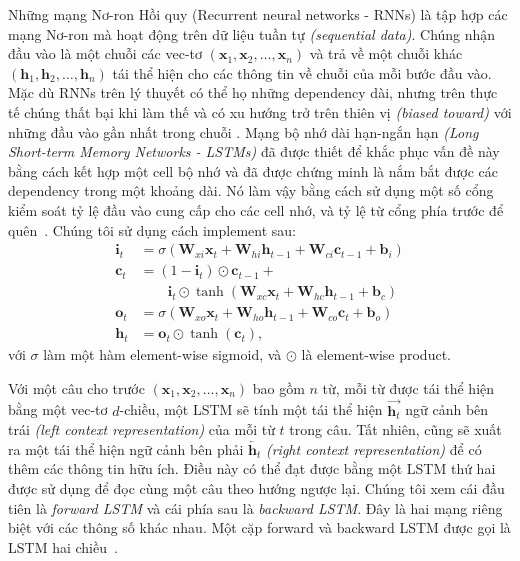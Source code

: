 \documentclass[11pt,letterpaper]{article}
\begin{document}
Những mạng Nơ-ron Hồi quy (Recurrent neural networks - RNNs) là tập hợp các mạng Nơ-ron mà hoạt động trên dữ liệu tuần tự \textit{(sequential data)}.
Chúng nhận đầu vào là một chuỗi các vec-tơ $(\mathbf{x}_1, \mathbf{x}_2, \ldots, \mathbf{x}_n)$ và trả về một chuỗi khác $(\mathbf{h}_1, \mathbf{h}_2, \ldots, \mathbf{h}_n)$ tái thể hiện cho các thông tin về chuỗi của mỗi bước đầu vào.
Mặc dù RNNs trên lý thuyết có thể họ những dependency dài, nhưng trên thực tế chúng thất bại khi làm thế và có xu hướng trở trên thiên vị \textit{(biased toward)} với những đầu vào gần nhất trong chuỗi \cite{bengio1994learning}. 
Mạng bộ nhớ dài hạn-ngắn hạn \textit{(Long Short-term Memory Networks - LSTMs)} đã được thiết để khắc phục vấn đề này bằng cách kết hợp một cell bộ nhớ và đã được chứng minh là nắm bắt được các dependency trong một khoảng dài. 
Nó làm vậy bằng cách sử dụng một số cổng kiểm soát tỷ lệ đầu vào cung cấp cho các cell nhớ, và tỷ lệ từ cổng phía trước để quên~\cite{hochreiter:1997}.
Chúng tôi sử dụng cách implement sau:
\\
\begin{align*}
\mathbf{i}_{t} &= \sigma(\mathbf{W}_{xi}\mathbf{x}_{t} + \mathbf{W}_{hi}\mathbf{h}_{t-1} + \mathbf{W}_{ci}\mathbf{c}_{t-1} + \mathbf{b}_{i})\\
\mathbf{c}_{t} &= (1 - \mathbf{i}_{t})\odot\mathbf{c}_{t-1} +\\
&\qquad \mathbf{i}_{t}\odot \tanh(\mathbf{W}_{xc}\mathbf{x}_{t} + \mathbf{W}_{hc}\mathbf{h}_{t-1} + \mathbf{b}_{c})\\
\mathbf{o}_{t} &= \sigma(\mathbf{W}_{xo}\mathbf{x}_{t} + \mathbf{W}_{ho}\mathbf{h}_{t-1} + \mathbf{W}_{co}\mathbf{c}_{t} + \mathbf{b}_{o})\\
\mathbf{h}_{t} &= \mathbf{o}_{t}\odot\tanh(\mathbf{c}_{t}),
\end{align*}
với $\sigma$ làm một hàm element-wise sigmoid, và $\odot$ là element-wise product.

Với một câu cho trước $(\mathbf{x}_1, \mathbf{x}_2, \ldots, \mathbf{x}_n)$ bao gồm $n$ từ, mỗi từ được tái thể hiện bằng một vec-tơ $d$-chiều, một LSTM sẽ tính một tái thể hiện $\overrightarrow{\mathbf{h}_t}$ ngữ cảnh bên trái \textit{(left context representation)} của mỗi từ $t$ trong câu. 
Tất nhiên, cũng sẽ xuất ra một tái thể hiện ngữ cảnh bên phải $\overleftarrow{\mathbf{h}_t}$ \textit{(right context representation)} để có thêm các thông tin hữu ích. 
Điều này có thể đạt được bằng một LSTM thứ hai được sử dụng để đọc cùng một câu theo hướng ngược lại. 
Chúng tôi xem cái đầu tiên là \textit{forward LSTM} và cái phía sau là \textit{backward LSTM}. 
Đây là hai mạng riêng biệt với các thông số khác nhau. 
Một cặp forward và backward LSTM được gọi là LSTM hai chiều~\cite{graves:2005}.
\end{document}
